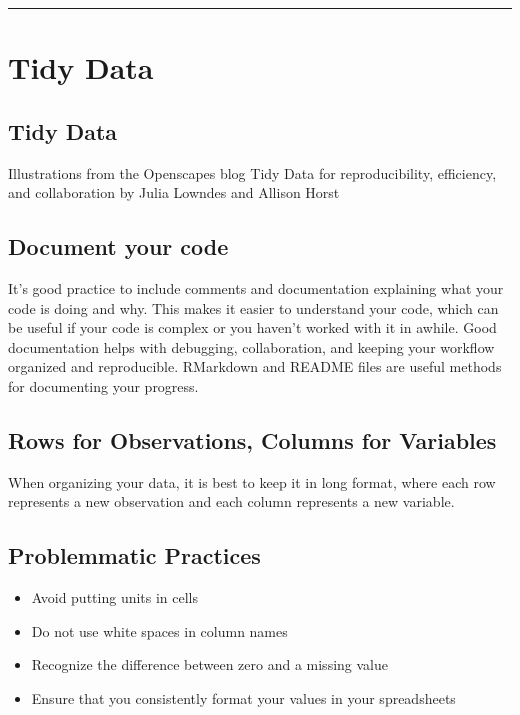\documentclass[
]{book}
\providecommand{\tightlist}{%
  \setlength{\itemsep}{0pt}\setlength{\parskip}{0pt}}
\begin{document}
\begin{center}\rule{0.5\linewidth}{0.5pt}\end{center}

\chapter{Tidy Data}\label{tidy-data}

\section{Tidy Data}\label{tidy-data-1}

Illustrations from the Openscapes blog Tidy Data for reproducibility, efficiency, and collaboration by Julia Lowndes and Allison Horst

\section{Document your code}\label{document-your-code}

It's good practice to include comments and documentation explaining what your code is doing and why. This makes it easier to understand your code, which can be useful if your code is complex or you haven't worked with it in awhile. Good documentation helps with debugging, collaboration, and keeping your workflow organized and reproducible. RMarkdown and README files are useful methods for documenting your progress.

\section{Rows for Observations, Columns for Variables}\label{rows-for-observations-columns-for-variables}

When organizing your data, it is best to keep it in long format, where each row represents a new observation and each column represents a new variable.

\section{Problemmatic Practices}\label{problemmatic-practices}

\begin{itemize}
\tightlist
\item
  Avoid putting units in cells
\item
  Do not use white spaces in column names
\item
  Recognize the difference between zero and a missing value
\item
  Ensure that you consistently format your values in your spreadsheets
\end{itemize}
\end{document}
